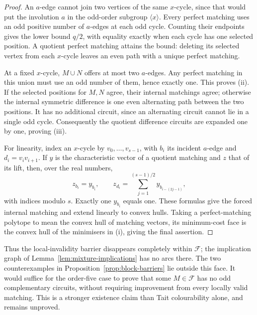 \documentclass[11pt,a4paper]{article}
\theoremstyle{definition}
\theoremstyle{remark}
\begin{document}
\begin{proof}
An $a$-edge cannot join two vertices of the same $x$-cycle, since that would put the involution $a$ in the odd-order subgroup $\langle x\rangle$.  Every perfect matching uses an odd positive number of $a$-edges at each odd cycle.  Counting their endpoints gives the lower bound $q/2$, with equality exactly when each cycle has one selected position.  A quotient perfect matching attains the bound: deleting its selected vertex from each $x$-cycle leaves an even path with a unique perfect matching.

At a fixed $x$-cycle, $M\cup N$ offers at most two $a$-edges.  Any perfect matching in this union must use an odd number of them, hence exactly one.  This proves \textup{(ii)}.  If the selected positions for $M,N$ agree, their internal matchings agree; otherwise the internal symmetric difference is one even alternating path between the two positions.  It has no additional circuit, since an alternating circuit cannot lie in a single odd cycle.  Consequently the quotient difference circuits are expanded one by one, proving \textup{(iii)}.

For linearity, index an $x$-cycle by $v_0,\ldots,v_{s-1}$, with $b_i$ its incident $a$-edge and $d_i=v_iv_{i+1}$.  If $y$ is the characteristic vector of a quotient matching and $z$ that of its lift, then, over the real numbers,
\[
 z_{b_i}=y_{b_i},\qquad
 z_{d_i}=\sum_{j=1}^{(s-1)/2}y_{b_{i-(2j-1)}},
\]
with indices modulo $s$.  Exactly one $y_{b_i}$ equals one.  These formulas give the forced internal matching and extend linearly to convex hulls.  Taking a perfect-matching polytope to mean the convex hull of matching vectors, its minimum-cost face is the convex hull of the minimisers in \textup{(i)}, giving the final assertion.
\end{proof}

Thus the local-invalidity barrier disappears completely within $\mathcal F$; the implication graph of Lemma~\ref{lem:mixture-implications} has no arcs there.  The two counterexamples in Proposition~\ref{prop:block-barriers} lie outside this face.  It would suffice for the order-five case to prove that some $M\in\mathcal F$ has no odd complementary circuits, without requiring improvement from every locally valid matching.  This is a stronger existence claim than Tait colourability alone, and remains unproved.
\end{document}

